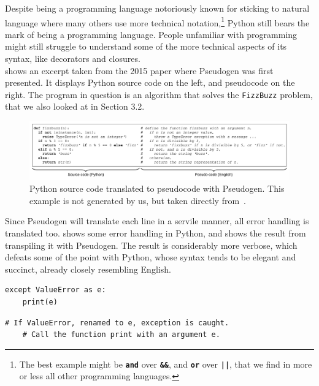 Despite being a programming language notoriously known for sticking to natural language where many others use more technical notation,\footnote{The best example might be \textbf{\texttt{and}} over \textbf{\texttt{\&\&}}, and \textbf{\texttt{or}} over \textbf{\texttt{||}}, that we find in more or less all other programming languages.} Python still bears the mark of being a programming language. People unfamiliar with programming might still struggle to understand some of the more technical aspects of its syntax, like decorators and closures. \\

 shows an excerpt taken from the 2015 paper where Pseudogen was first presented. It displays Python source code on the left, and pseudocode on the right. The program in question is an algorithm that solves the \texttt{FizzBuzz} problem, that we also looked at in Section 3.2. \\

\begin{figure}[ht]
    \centering
    \includegraphics[scale=0.52]{assets/chapter3/odaetal.png}
    \caption{Python source code translated to pseudocode with Pseudogen. This example is not generated by us, but taken directly from~\cite{pseudogen}.}
    \label{pseudogenExample1}
\end{figure}

Since Pseudogen will translate each line in a servile manner, all error handling is translated too.  shows some error handling in Python, and  shows the result from transpiling it with Pseudogen. The result is considerably more verbose, which defeats some of the point with Python, whose syntax tends to be elegant and succinct, already closely resembling English. \\

\begin{lstlisting}[caption={Error handling in Python.}, captionpos=b, label={Error handling in Python.}]
except ValueError as e:
    print(e)
\end{lstlisting}

\begin{lstlisting}[caption={Pseudocode version of \Cref{Error handling in Python.} generated with Pseudogen. This example is not generated by us, but copied from a video on their website.}, captionpos=b, label={Error handling in Pseudogen.}]
# If ValueError, renamed to e, exception is caught.
    # Call the function print with an argument e.
\end{lstlisting}

